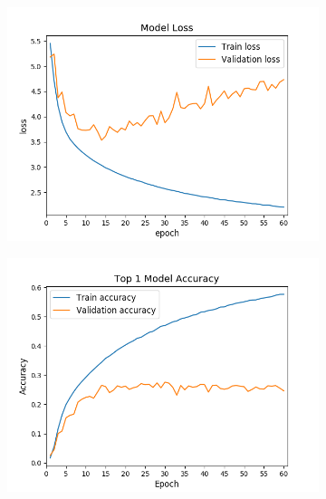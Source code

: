 \begin{figure}[!h]
        \centering
        \begin{subfigure}[b]{0.32\textwidth}
            \centering
            \includegraphics[width=\textwidth]{images/final_loss.png}
            \caption[]%
            {{\small }}
        \end{subfigure}
        \hfill
        \begin{subfigure}[b]{0.32\textwidth}
            \centering
            \includegraphics[width=\textwidth]{images/final_top1.png}
            \caption[]%
            {{\small }}
        \end{subfigure}
        \hfill
        \begin{subfigure}[b]{0.32\textwidth}

\end{subfigure}
\end{figure}
